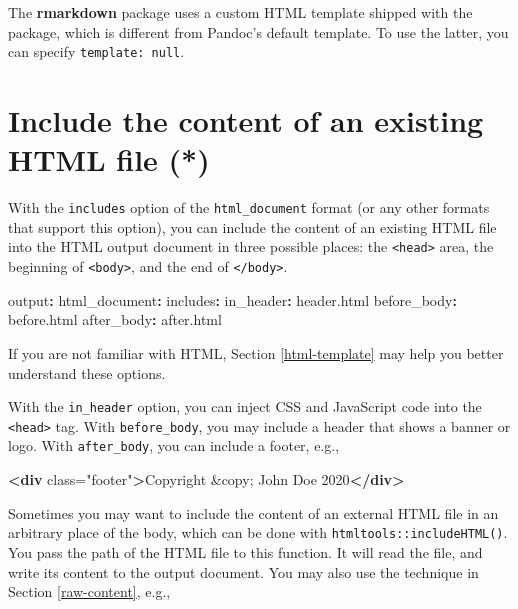 \documentclass[
  11pt,
]{krantz}
\newenvironment{Shaded}{\begin{snugshade}}{\end{snugshade}}
\newcommand{\AttributeTok}[1]{\textcolor[rgb]{0.61,0.61,0.61}{#1}}
\newcommand{\DecValTok}[1]{\textcolor[rgb]{0.06,0.06,0.06}{#1}}
\newcommand{\FunctionTok}[1]{\textcolor[rgb]{0,0,0}{#1}}
\newcommand{\KeywordTok}[1]{\textcolor[rgb]{0.27,0.27,0.27}{\textbf{#1}}}
\newcommand{\NormalTok}[1]{#1}
\newcommand{\OtherTok}[1]{\textcolor[rgb]{0.37,0.37,0.37}{#1}}
\newcommand{\StringTok}[1]{\textcolor[rgb]{0.5,0.5,0.5}{#1}}
\begin{document}
The \textbf{rmarkdown} package uses a custom HTML template shipped with the package, which is different from Pandoc's default template. To use the latter, you can specify \texttt{template:\ null}.

\hypertarget{include-html}{%
\section{Include the content of an existing HTML file (*)}\label{include-html}}

With the \texttt{includes} option of the \texttt{html\_document} format (or any other formats that support this option), you can include the content of an existing HTML file into the HTML output document in three possible places: the \texttt{\textless{}head\textgreater{}} area, the beginning of \texttt{\textless{}body\textgreater{}}, and the end of \texttt{\textless{}/body\textgreater{}}.

\begin{Shaded}
\begin{Highlighting}[]
\FunctionTok{output}\KeywordTok{:}
\AttributeTok{  }\FunctionTok{html_document}\KeywordTok{:}
\AttributeTok{    }\FunctionTok{includes}\KeywordTok{:}
\AttributeTok{      }\FunctionTok{in_header}\KeywordTok{:}\AttributeTok{ header.html}
\AttributeTok{      }\FunctionTok{before_body}\KeywordTok{:}\AttributeTok{ before.html}
\AttributeTok{      }\FunctionTok{after_body}\KeywordTok{:}\AttributeTok{ after.html}
\end{Highlighting}
\end{Shaded}

If you are not familiar with HTML, Section \ref{html-template} may help you better understand these options.

With the \texttt{in\_header} option, you can inject CSS and JavaScript code into the \texttt{\textless{}head\textgreater{}} tag. With \texttt{before\_body}, you may include a header that shows a banner or logo. With \texttt{after\_body}, you can include a footer, e.g.,

\begin{Shaded}
\begin{Highlighting}[]
\KeywordTok{<div}\OtherTok{ class=}\StringTok{"footer"}\KeywordTok{>}\NormalTok{Copyright }\DecValTok{&copy;}\NormalTok{ John Doe 2020}\KeywordTok{</div>}
\end{Highlighting}
\end{Shaded}

Sometimes you may want to include the content of an external HTML file in an arbitrary place of the body, which can be done with \texttt{htmltools::includeHTML()}. You pass the path of the HTML file to this function. It will read the file, and write its content to the output document. You may also use the technique in Section \ref{raw-content}, e.g.,
\end{document}
